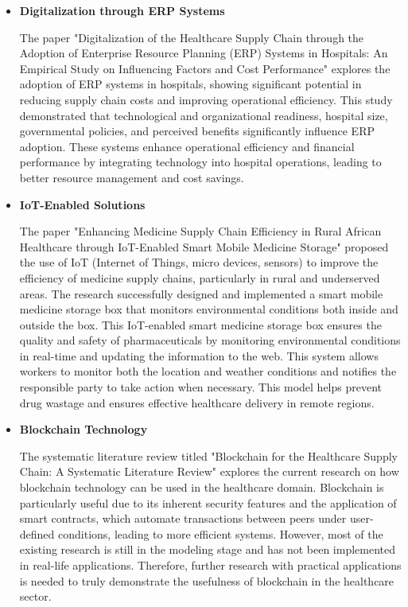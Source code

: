\documentclass[12pt]{report}
\begin{document}
\begin{itemize}
  \item \textbf{Digitalization through ERP Systems}
  
  The paper "Digitalization of the Healthcare Supply Chain through the Adoption of Enterprise Resource Planning (ERP) Systems in Hospitals: An Empirical Study on Influencing Factors and Cost Performance" \cite{ERPSupplyChain} explores the adoption of ERP systems in hospitals, showing significant potential in reducing supply chain costs and improving operational efficiency. This study demonstrated that technological and organizational readiness, hospital size, governmental policies, and perceived benefits significantly influence ERP adoption. These systems enhance operational efficiency and financial performance by integrating technology into hospital operations, leading to better resource management and cost savings.
  
  \item \textbf{IoT-Enabled Solutions}
  
  The paper "Enhancing Medicine Supply Chain Efficiency in Rural African Healthcare through IoT-Enabled Smart Mobile Medicine Storage" \cite{IotHealthCareSupplyChain} proposed the use of IoT (Internet of Things, micro devices, sensors) to improve the efficiency of medicine supply chains, particularly in rural and underserved areas. The research successfully designed and implemented a smart mobile medicine storage box that monitors environmental conditions both inside and outside the box. This IoT-enabled smart medicine storage box ensures the quality and safety of pharmaceuticals by monitoring environmental conditions in real-time and updating the information to the web. This system allows workers to monitor both the location and weather conditions and notifies the responsible party to take action when necessary. This model helps prevent drug wastage and ensures effective healthcare delivery in remote regions.
  
  \item \textbf{Blockchain Technology}
  
  The systematic literature review titled "Blockchain for the Healthcare Supply Chain: A Systematic Literature Review" \cite{BlockChainHeathCare} explores the current research on how blockchain technology can be used in the healthcare domain. Blockchain is particularly useful due to its inherent security features and the application of smart contracts, which automate transactions between peers under user-defined conditions, leading to more efficient systems. However, most of the existing research is still in the modeling stage and has not been implemented in real-life applications. Therefore, further research with practical applications is needed to truly demonstrate the usefulness of blockchain in the healthcare sector.
  

\end{itemize}
\end{document}
